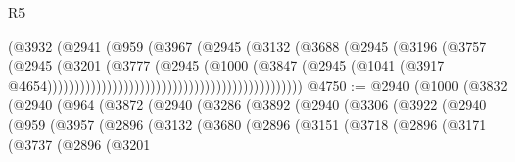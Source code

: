 \begin{lexlean}{R5}
\begin{coremodule}
                                                            (@3932
                                                              (@2941
                                                                (@959
                                                                  (@3967
                                                                    (@2945
                                                                      (@3132
                                                                        (@3688
                                                                          (@2945
                                                                            (@3196
                                                                              (@3757
                                                                                (@2945
                                                                                  (@3201
                                                                                    (@3777
                                                                                      (@2945
                                                                                        (@1000
                                                                                          (@3847
                                                                                            (@2945
                                                                                              (@1041
                                                                                                (@3917
                                                                                                  @4654)))))))))))))))))))))))))))))))))))))))))))))))
@4750 := @2940
    (@1000
      (@3832
        (@2940
          (@964
            (@3872
              (@2940
                (@3286
                  (@3892
                    (@2940
                      (@3306
                        (@3922
                          (@2940
                            (@959
                              (@3957
                                (@2896
                                  (@3132
                                    (@3680
                                      (@2896
                                        (@3151
                                          (@3718
                                            (@2896
                                              (@3171
                                                (@3737
                                                  (@2896
                                                    (@3201

\end{coremodule}
\end{lexlean}
